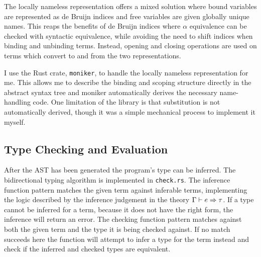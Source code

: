 \documentclass[12pt,a4paper,twoside]{report}
\begin{document}
The locally nameless representation \cite{chargueraud12} offers a mixed solution where bound variables are represented as de Bruijn indices and free variables are given globally unique names.
This reaps the benefits of de Bruijn indices where \(\alpha\) equivalence can be checked with syntactic equivalence, while avoiding the need to shift indices when binding and unbinding terms.
Instead, opening and closing operations are used on terms which convert to and from the two representations.

I use the Rust crate, \texttt{moniker}, to handle the locally nameless representation for me.
This allows me to describe the binding and scoping structure directly in the abstract syntax tree and moniker automatically derives the necessary name-handling code.
One limitation of the library is that substitution is not automatically derived, though it was a simple mechanical process to implement it myself.

\subsection{Type Checking and Evaluation}

After the AST has been generated the program's type can be inferred.
The bidirectional typing algorithm is implemented in \texttt{check.rs}.
The inference function pattern matches the given term against inferable terms, implementing the logic described by the inference judgement in the theory \(\Gamma \vdash e \Rightarrow \tau\).
If a type cannot be inferred for a term, because it does not have the right form, the inference will return an error.
The checking function pattern matches against both the given term and the type it is being checked against.
If no match succeeds here the function will attempt to infer a type for the term instead and check if the inferred and checked types are equivalent.
\end{document}
